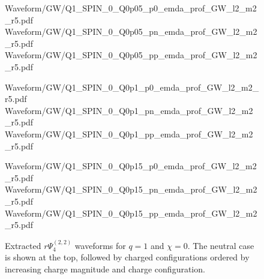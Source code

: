 \begin{figure}[p]
\centering
{}

\vspace{0.6em}

{Waveform/GW/Q1_SPIN_0_Q0p05_p0_emda_prof_GW_l2_m2_r5.pdf}
\hfill
{}
{Waveform/GW/Q1_SPIN_0_Q0p05_pn_emda_prof_GW_l2_m2_r5.pdf}
\hfill
{}
{Waveform/GW/Q1_SPIN_0_Q0p05_pp_emda_prof_GW_l2_m2_r5.pdf}

\vspace{0.6em}

{Waveform/GW/Q1_SPIN_0_Q0p1_p0_emda_prof_GW_l2_m2_r5.pdf}
\hfill
{}
{Waveform/GW/Q1_SPIN_0_Q0p1_pn_emda_prof_GW_l2_m2_r5.pdf}
\hfill
{}
{Waveform/GW/Q1_SPIN_0_Q0p1_pp_emda_prof_GW_l2_m2_r5.pdf}

\vspace{0.6em}

{Waveform/GW/Q1_SPIN_0_Q0p15_p0_emda_prof_GW_l2_m2_r5.pdf}
\hfill
{}
{Waveform/GW/Q1_SPIN_0_Q0p15_pn_emda_prof_GW_l2_m2_r5.pdf}
\hfill
{}
{Waveform/GW/Q1_SPIN_0_Q0p15_pp_emda_prof_GW_l2_m2_r5.pdf}

\caption[Gravitational-wave catalog for $q=1$, $\chi=0$]{
Extracted $r\Psi_4^{(2,2)}$ waveforms for $q=1$ and $\chi=0$. The neutral case is shown at the top, followed by charged configurations ordered by increasing charge magnitude and charge configuration.
}
\label{fig:gw_catalog_q1_chi0}
\end{figure}
